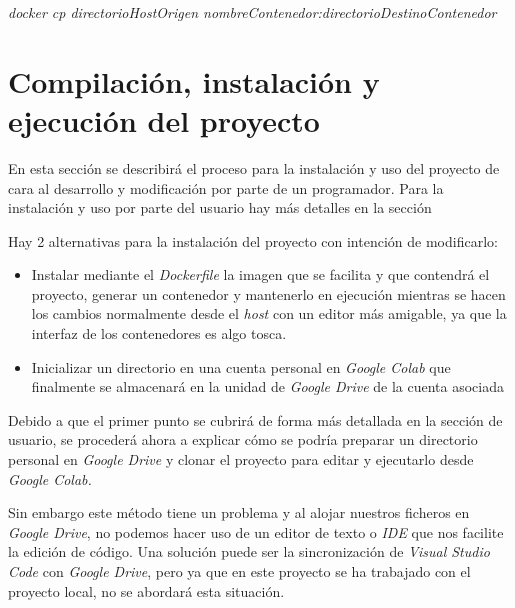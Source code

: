 \begin{itemize}
   \emph{docker cp directorioHostOrigen nombreContenedor:directorioDestinoContenedor}
    
\end{itemize}


\section{Compilación, instalación y ejecución del proyecto}
En esta sección se describirá el proceso para la instalación y uso del proyecto de cara al desarrollo y modificación por parte de un programador. Para la instalación y uso por parte del usuario hay más detalles en la sección 

Hay 2 alternativas para la instalación del proyecto con intención de modificarlo:

\begin{itemize}
    \item Instalar mediante el \emph{Dockerfile} la imagen que se facilita y que contendrá el proyecto, generar un contenedor y mantenerlo en ejecución mientras se hacen los cambios normalmente desde el \emph{host} con un editor más amigable, ya que la interfaz de los contenedores es algo tosca.
    \item Inicializar un directorio en una cuenta personal en \emph{Google Colab} que finalmente se almacenará en la unidad de \emph{Google Drive} de la cuenta asociada
\end{itemize}

Debido a que el primer punto se cubrirá de forma más detallada en la sección de usuario, se procederá ahora a explicar cómo se podría preparar un directorio personal en \emph{Google Drive} y clonar el proyecto para editar y ejecutarlo desde \emph{Google Colab.}

Sin embargo este método tiene un problema y al alojar nuestros ficheros en \emph{Google Drive}, no podemos hacer uso de un editor de texto o \emph{IDE} que nos facilite la edición de código. Una solución puede ser la sincronización de \emph{Visual Studio Code} con \emph{Google Drive}, pero ya que en este proyecto se ha trabajado con el proyecto local, no se abordará esta situación.

